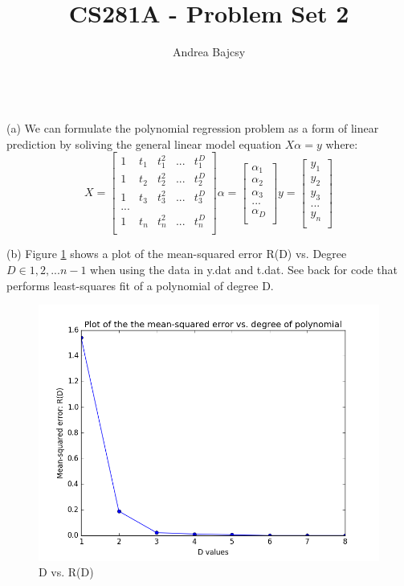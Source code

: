 \documentclass[11pt]{article}
\newenvironment{problem}[2][Problem]{\begin{trivlist}
\item[\hskip \labelsep {\bfseries #1}\hskip \labelsep {\bfseries #2.}]}{\end{trivlist}}
\begin{document}
 
\title{CS281A - Problem Set 2}
\author{Andrea Bajcsy}
 
\maketitle
 
\begin{problem}{2.1}
\text{ }\\

(a) We can formulate the polynomial regression problem as a form of linear prediction by soliving the general linear model equation $X\alpha = y$ where:
\\
\[
X=
  \begin{bmatrix}
    1 & t_{1} & t^2_{1} & ... & t^D_{1}\\
    1 & t_{2} & t^2_{2} & ... & t^D_{2}\\
    1 & t_{3} & t^2_{3} & ... & t^D_{3}\\
    ...\\
    1 & t_{n} & t^2_{n} & ... & t^D_{n}\\
  \end{bmatrix}
\alpha=
	\begin{bmatrix}
		\alpha_{1}\\
		\alpha_{2}\\
		\alpha_{3}\\
		...\\
		\alpha_{D}\\
	 \end{bmatrix}
y=
	\begin{bmatrix}
		y_{1}\\
		y_{2}\\
		y_{3}\\
		...\\
		y_{n}\\
	 \end{bmatrix}
\]

(b) Figure \ref{fig:2b} shows a plot of the mean-squared error R(D) vs. Degree $D \in {1,2,...n-1}$ when using the data in y.dat and t.dat. See back for code that performs least-squares fit of a polynomial of degree D. 
\begin{figure}[h!]
  \centering
  \includegraphics[scale=0.5]{figs/2b.png}
  \caption{D vs. R(D)}
  \label{fig:2b}
\end{figure}


\end{problem}
\end{document}
